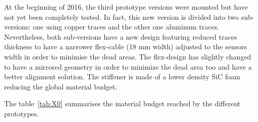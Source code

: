     At the beginning of 2016, the third prototype versions were mounted but have not yet been completely tested.
    In fact, this new version is divided into two sub-versions: one using copper traces and the other one aluminum traces.
    Nevertheless, both sub-versions have a new design featuring reduced traces thickness to have a narrower flex-cable (18 mm width) adjusted to the sensors width in order to minimise the dead areas.
    The flex-design has slightly changed to have a mirrored geometry in order to minimize the dead area too and have a better alignment solution.
    The stiffener is made of a lower density \gls{SiC} foam reducing the global material budget. 

    The table~\ref{tab:X0} summarises the material budget reached by the different prototypes.

   

    
     


